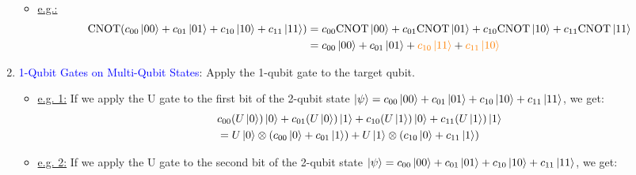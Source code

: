 \documentclass{book}
\begin{document}
\begin{enumerate}
\begin{center}
    \end{center}
    \begin{itemize}
        \item \uline{e.g.:} \begin{align*}
            \text{CNOT}(c_{00}\ket{00} + c_{01}\ket{01} + c_{10}\ket{10} + c_{11}\ket{11}) &= c_{00}\text{CNOT}\ket{00} + c_{01}\text{CNOT}\ket{01} + c_{10}\text{CNOT}\ket{10} + c_{11}\text{CNOT}\ket{11} \\
            &= c_{00}\ket{00} + c_{01}\ket{01} + \textcolor{orange}{c_{10}\ket{11}} + \textcolor{orange}{c_{11}\ket{10}}
        \end{align*}
    \end{itemize}
    \item \textcolor{blue}{1-Qubit Gates on Multi-Qubit States}: Apply the 1-qubit gate to the target qubit.
    \begin{itemize}
        \item \uline{e.g. 1:} If we apply the U gate to the first bit of the 2-qubit state \(\ket{\psi} = c_{00}\ket{00} + c_{01}\ket{01} + c_{10}\ket{10} + c_{11}\ket{11}\), we get:
        \begin{align*}
            & c_{00}(U\ket{0})\ket{0} + c_{01}(U\ket{0})\ket{1} + c_{10}(U\ket{1})\ket{0} + c_{11}(U\ket{1})\ket{1} \\
            &= U\ket{0} \otimes (c_{00}\ket{0} + c_{01}\ket{1}) + U\ket{1} \otimes (c_{10}\ket{0} + c_{11}\ket{1})
        \end{align*}
        \item \uline{e.g. 2:} If we apply the U gate to the second bit of the 2-qubit state \(\ket{\psi} = c_{00}\ket{00} + c_{01}\ket{01} + c_{10}\ket{10} + c_{11}\ket{11}\), we get:
        \begin{align*}

\end{align*}
\end{itemize}
\end{enumerate}
\end{document}
